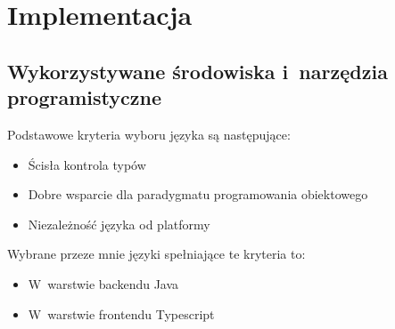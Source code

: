 \chapter{Implementacja}\label{ch:implementation}
\section{Wykorzystywane środowiska i~narzędzia programistyczne}\label{sec:dev-tools}
Podstawowe kryteria wyboru języka są następujące:

\begin{itemize}
    \item Ścisła kontrola typów
    \item Dobre wsparcie dla paradygmatu programowania obiektowego
    \item Niezależność języka od platformy
\end{itemize}

Wybrane przeze mnie języki spełniające te kryteria to:

\begin{itemize}
    \item W~warstwie backendu Java\cite{tech:java}
    \item W~warstwie frontendu Typescript\cite{tech:typescript}
\end{itemize}

